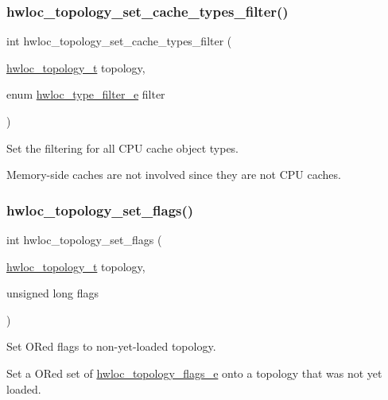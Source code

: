 \subsubsection{\texorpdfstring{hwloc\+\_\+topology\+\_\+set\+\_\+cache\+\_\+types\+\_\+filter()}{hwloc\_topology\_set\_cache\_types\_filter()}}
{\footnotesize\ttfamily int hwloc\+\_\+topology\+\_\+set\+\_\+cache\+\_\+types\+\_\+filter (\begin{DoxyParamCaption}\item[{\hyperlink{a00186_ga9d1e76ee15a7dee158b786c30b6a6e38}{hwloc\+\_\+topology\+\_\+t}}]{topology,  }\item[{enum \hyperlink{a00193_ga9a5a1f0140cd1952544477833733195b}{hwloc\+\_\+type\+\_\+filter\+\_\+e}}]{filter }\end{DoxyParamCaption})}



Set the filtering for all C\+PU cache object types. 

Memory-\/side caches are not involved since they are not C\+PU caches. \mbox{\label{a00193_gaaeed4df656979e5f16befea9d29b814b}} 
\subsubsection{\texorpdfstring{hwloc\+\_\+topology\+\_\+set\+\_\+flags()}{hwloc\_topology\_set\_flags()}}
{\footnotesize\ttfamily int hwloc\+\_\+topology\+\_\+set\+\_\+flags (\begin{DoxyParamCaption}\item[{\hyperlink{a00186_ga9d1e76ee15a7dee158b786c30b6a6e38}{hwloc\+\_\+topology\+\_\+t}}]{topology,  }\item[{unsigned long}]{flags }\end{DoxyParamCaption})}



Set OR\textquotesingle{}ed flags to non-\/yet-\/loaded topology. 

Set a OR\textquotesingle{}ed set of \hyperlink{a00193_gada025d3ec20b4b420f8038d23d6e7bde}{hwloc\+\_\+topology\+\_\+flags\+\_\+e} onto a topology that was not yet loaded.

